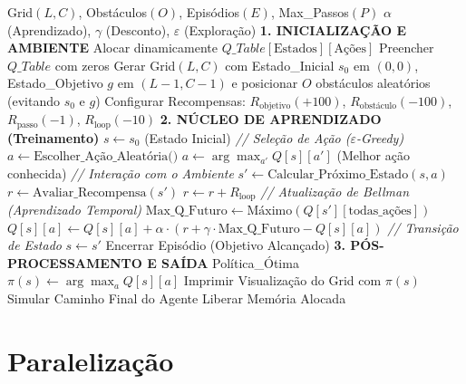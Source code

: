 \documentclass[12pt]{article}
\begin{document}
\begin{algorithm}
\caption{Q-Learning Sequencial}
\label{alg:qlearning}
\begin{algorithmic}[1]
\Require Grid$(L, C)$, Obstáculos$(O)$, Episódios$(E)$, Max\_Passos$(P)$
\Require $\alpha$ (Aprendizado), $\gamma$ (Desconto), $\varepsilon$ (Exploração)
\Statex \textbf{1. INICIALIZAÇÃO E AMBIENTE}
\State Alocar dinamicamente $Q\_Table[\text{Estados}][\text{Ações}]$
\State Preencher $Q\_Table$ com zeros
\State Gerar Grid$(L, C)$ com Estado\_Inicial $s_0$ em $(0,0)$, Estado\_Objetivo $g$ em $(L{-}1, C{-}1)$
\State \hspace{1.5em} e posicionar $O$ obstáculos aleatórios (evitando $s_0$ e $g$)
\State Configurar Recompensas: $R_{\text{objetivo}}(+100)$, $R_{\text{obstáculo}}(-100)$, $R_{\text{passo}}(-1)$, $R_{\text{loop}}(-10)$
\Statex \textbf{2. NÚCLEO DE APRENDIZADO (Treinamento)}
  \State $s \leftarrow s_0$ (Estado Inicial)
    \State \textit{// Seleção de Ação ($\varepsilon$-Greedy)}
      \State $a \leftarrow \text{Escolher\_Ação\_Aleatória()}$
    \Else
      \State $a \leftarrow \arg\max_{a'} Q[s][a']$ (Melhor ação conhecida)
    \EndIf
    \State \textit{// Interação com o Ambiente}
    \State $s' \leftarrow \text{Calcular\_Próximo\_Estado}(s, a)$
    \State $r \leftarrow \text{Avaliar\_Recompensa}(s')$
      \State $r \leftarrow r + R_{\text{loop}}$ 
    \EndIf
    \State \textit{// Atualização de Bellman (Aprendizado Temporal)}
    \State $\text{Max\_Q\_Futuro} \leftarrow \text{Máximo}(Q[s'][\text{todas\_ações}])$
    \State $Q[s][a] \leftarrow Q[s][a] + \alpha \cdot (r + \gamma \cdot \text{Max\_Q\_Futuro} - Q[s][a])$
    \State \textit{// Transição de Estado}
    \State $s \leftarrow s'$
      \State Encerrar Episódio (Objetivo Alcançado)
    \EndIf
  \EndFor
\EndFor
\Statex \textbf{3. PÓS-PROCESSAMENTO E SAÍDA}
\State Política\_Ótima $\pi(s) \leftarrow \arg\max_a Q[s][a]$
\State Imprimir Visualização do Grid com $\pi(s)$
\State Simular Caminho Final do Agente
\State Liberar Memória Alocada
\end{algorithmic}
\end{algorithm}
\section{Paralelização}
\label{sec:org36fb564}
\end{document}
